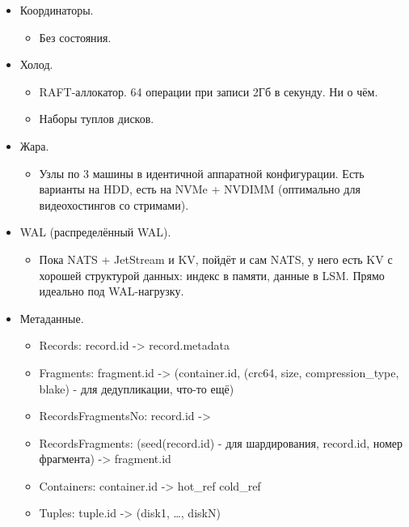 \begin{itemize}
\tightlist
\item
  Координаторы.

  \begin{itemize}
  \tightlist
  \item
    Без состояния.
  \end{itemize}
\item
  Холод.

  \begin{itemize}
  \tightlist
  \item
    RAFT-аллокатор. 64 операции при записи 2Гб в секунду. Ни о чём.
  \item
    Наборы туплов дисков.
  \end{itemize}
\item
  Жара.

  \begin{itemize}
  \tightlist
  \item
    Узлы по 3 машины в идентичной аппаратной конфигурации. Есть варианты
    на HDD, есть на NVMe + NVDIMM (оптимально для видеохостингов со
    стримами).
  \end{itemize}
\item
  WAL (распределённый WAL).

  \begin{itemize}
  \tightlist
  \item
    Пока NATS + JetStream и KV, пойдёт и сам NATS, у него есть KV с
    хорошей структурой данных: индекс в памяти, данные в LSM. Прямо
    идеально под WAL-нагрузку.
  \end{itemize}
\item
  Метаданные.

  \begin{itemize}
  \tightlist
  \item
    Records: record.id -\textgreater{} record.metadata
  \item
    Fragments: fragment.id -\textgreater{} (container.id, (crc64, size,
    compression\_type, blake) - для дедупликации, что-то ещё)
  \item
    RecordsFragmentsNo: record.id -\textgreater{}
  \item
    RecordsFragments: (seed(record.id) - для шардирования, record.id,
    номер фрагмента) -\textgreater{} fragment.id
  \item
    Containers: container.id -\textgreater{} hot\_ref \textbar{}
    cold\_ref
  \item
    Tuples: tuple.id -\textgreater{} (disk1, \ldots, diskN)
  \end{itemize}
\end{itemize}

